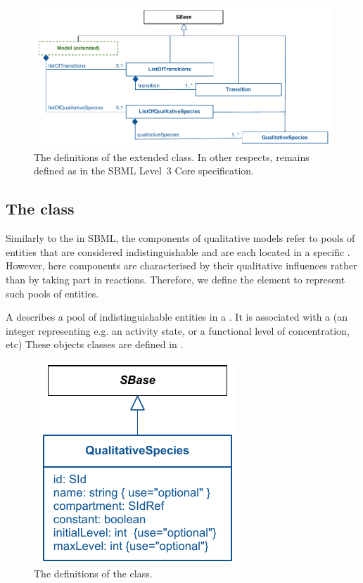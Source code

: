 \begin{figure}[h!]
  \includegraphics{figs/qual-extended-model-uml.pdf}
  \caption{The definitions of the extended \Model class. In other respects, \Model remains defined as
    in the SBML Level~3 Core specification.}
  \label{qual-extended-model-uml}
\end{figure}

\pagebreak
\subsection{The  class}
\label{qualSpecies-class}
Similarly to the  in SBML, the components of qualitative models refer to pools of entities that are considered indistinguishable and are each located in a specific . However, here components are characterised by their qualitative influences rather than by taking part in reactions. Therefore, we define the \QualitativeSpecies element to represent such pools of entities.

A \QualitativeSpecies describes a pool of indistinguishable entities in a . It is associated with  a  (an integer representing e.g. an activity state, or a functional level of concentration, etc)  %
 These objects classes are defined in .
\begin{figure}[h]
  \includegraphics{figs/qual-qualitative-species-uml.pdf}
  \caption{The definitions of the \QualitativeSpecies class. }
  \label{qual-qualitative-species-uml}
\end{figure}

